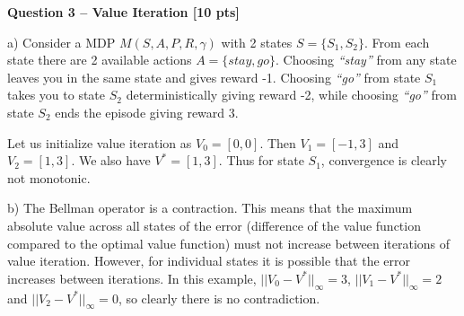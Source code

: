 \newpage
\textbf{\Large Question 3 -- Value Iteration \hfill [10 pts]}
\vspace{0.5cm}

a) Consider a MDP $M(S,A,P,R,\gamma)$ with 2 states $S=\{S_1,S_2\}$. From each state there are 2 available actions $A=\{stay,go\}$. Choosing \textit{``stay''} from any state leaves you in the same state and gives reward -1. Choosing \textit{``go''} from state $S_1$ takes you to state $S_2$ deterministically giving reward -2, while choosing \textit{``go''} from state $S_2$ ends the episode giving reward 3.

Let us initialize value iteration as $V_0 = [0, 0]$. Then $V_1 = [-1, 3]$ and $V_2 = [1, 3]$. We also have $V^{\ast}=[1, 3]$. Thus for state $S_1$, convergence is clearly not monotonic.

b) The Bellman operator is a contraction. This means that the maximum absolute value across all states of the error (difference of the value function compared to the optimal value function) must not increase between iterations of value iteration. However, for individual states it is possible that the error increases between iterations. In this example, $||V_0 - V^{\ast}||_{\infty} = 3$, $||V_1 - V^{\ast}||_{\infty} = 2$ and $||V_2 - V^{\ast}||_{\infty} = 0$, so clearly there is no contradiction.







